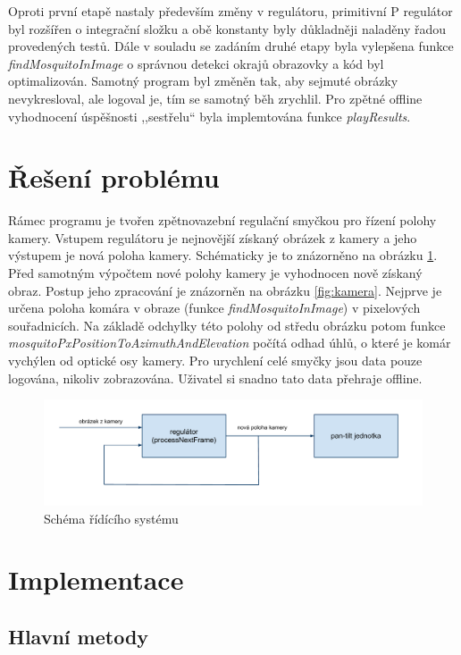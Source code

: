 \documentclass[a4paper,10pt]{article}
\begin{document}
Oproti první etapě nastaly především změny v regulátoru, primitivní P regulátor byl rozšířen o integrační složku a obě konstanty byly důkladněji naladěny řadou provedených testů. Dále v souladu se zadáním druhé etapy byla vylepšena funkce \textit{findMosquitoInImage} o správnou detekci okrajů obrazovky a kód byl optimalizován. Samotný program byl změněn tak, aby sejmuté obrázky nevykresloval, ale logoval je, tím se samotný běh zrychlil. Pro zpětné offline vyhodnocení úspěšnosti ,,sestřelu`` byla implemtována funkce \textit{playResults}.

\section{Řešení problému}

Rámec programu je tvořen zpětnovazební regulační smyčkou pro řízení polohy kamery. Vstupem regulátoru je nejnovější získaný obrázek z kamery a jeho výstupem je nová poloha kamery. Schématicky je to znázorněno na obrázku \ref{fig:rid_system}.
Před samotným výpočtem nové polohy kamery je vyhodnocen nově získaný obraz. Postup jeho zpracování je znázorněn na obrázku \ref{fig:kamera}.
Nejprve je určena poloha komára v obraze (funkce \textit{findMosquitoInImage}) v pixelových souřadnicích. Na základě odchylky této polohy od středu obrázku potom funkce \textit{mosquitoPxPositionToAzimuthAndElevation} počítá odhad úhlů, o které je komár vychýlen od optické osy kamery. Pro urychlení celé smyčky jsou data pouze logována, nikoliv zobrazována. Uživatel si snadno tato data přehraje offline.

\begin{figure}[!h]
    \centering
     \includegraphics[width=1\columnwidth]{pics/schema_ridiciho_systemu}
     \caption{Schéma řídícího systému\label{fig:rid_system}}
\end{figure}


\section{Implementace}

\subsection{Hlavní metody}
\end{document}
